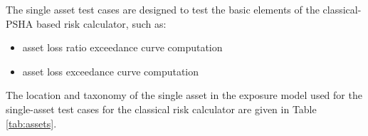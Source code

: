 The single asset test cases are designed to test the basic elements of the classical-PSHA based risk calculator, such as:

\begin{itemize}
\item asset loss ratio exceedance curve computation
\item asset loss exceedance curve computation
\end{itemize}



The location and taxonomy of the single asset in the exposure model used for the single-asset test cases for the classical risk calculator are given in Table \ref{tab:assets}.